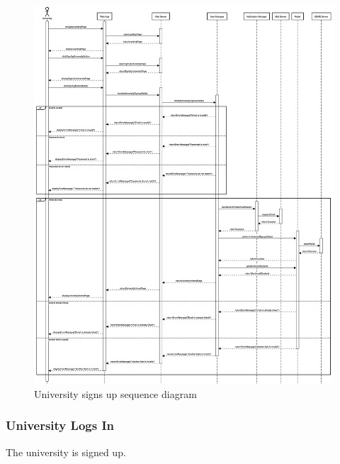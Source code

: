 \begin{figure}[h!]
    \centering
    \includegraphics[width=14cm]{images/sequence-diagrams/university-signs-up.png}
    \caption{University signs up sequence diagram}
\end{figure}

\clearpage
\subsubsection{University Logs In}
The university is signed up. 

